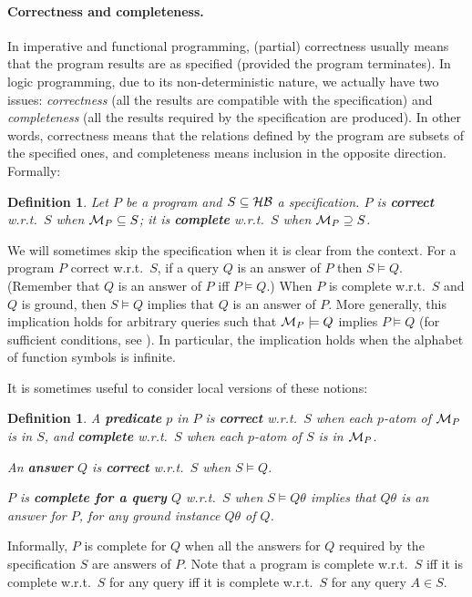 \documentclass{tlp}
\newtheorem{definition}[theorem]{Definition}
\newcommand*{\HB}{{\ensuremath{\cal{H B}}}\xspace}
\newcommand*{\M}{{\ensuremath{\cal M}}\xspace}
\begin{document}
\paragraph{Correctness and completeness.}
In imperative and functional programming, (partial) correctness usually means
that the program results are as specified (provided the program terminates).
  In logic programming, due to its non-deterministic nature,
we actually have two issues: {\em correctness} (all the results are
compatible with the specification) and {\em completeness} (all the results
required by the specification are produced). 
In other words, correctness means that the relations defined by the program are
subsets of the specified ones, and completeness means inclusion in the
opposite  direction. 
Formally:
\begin{definition}
\label{def:corr:compl}
Let $P$ be a program and $S\subseteq\HB$ a specification.
$P$ is {\bf correct} w.r.t.\ $S$ when $\M_P\subseteq S$;
it is {\bf complete} w.r.t.\ $S$ when $\M_P\supseteq S$.
\end{definition}
We will sometimes skip the specification when it is clear from the context.
For a program $P$ correct w.r.t.\ $S$,
if a query $Q$ is an answer of $P$ then $S\models Q$.
(Remember that $Q$ is an answer of $P$ iff $P\models Q$.)
When $P$ is complete w.r.t.\ $S$ and $Q$ is ground,
then $S\models Q$ implies that $Q$ is an answer of $P$. 
More generally, this implication holds for arbitrary queries such that
$\M_P\models Q$ implies $P\models Q$
(for sufficient conditions,
see \cite{DBLP:books/mk/minker88/Maher88,Apt-Prolog,drabent.tocl16,drabent.Herbrand.2016}).
In particular, the implication holds when the alphabet of function symbols is infinite.












\pagebreak[3]
It is sometimes useful to consider local versions of these notions:

\pagebreak[3]
\begin{definition}
\nopagebreak
\label{def:corr:compl:local}
\nopagebreak
A {\bf predicate} $p$ in $P$ is
{\bf correct} w.r.t.\ $S$ when each $p$-atom of $\M_P$ is in $S$, and 
 {\bf complete} w.r.t.\ $S$ when each $p$-atom of $S$ is in $\M_P$.

An {\bf answer} $Q$ is  {\bf correct} w.r.t.\ $S$ when $S\models Q$.

$P$ is {\bf complete for a query} $Q$ w.r.t.\  $S$
when
$S\models Q\theta$ implies that $Q\theta$ is an answer for $P$,
for any ground instance $Q\theta$ of $Q$.
\end{definition}
Informally,  $P$ is complete for $Q$
when 
all the answers for $Q$ required by the specification $S$ are answers of $P$.
Note that a program is complete w.r.t.\ $S$
 iff it is complete w.r.t.\ $S$ for any query
 iff it is complete w.r.t.\ $S$ for any query $A\in S$.
\end{document}
